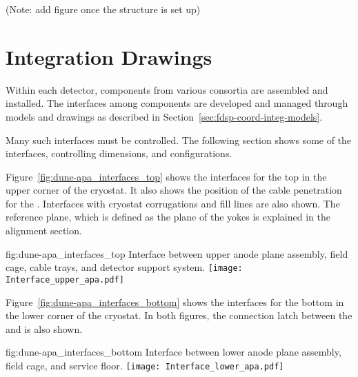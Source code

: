 (Note: add figure once the  structure is set up)






\section{Integration Drawings}
\label{sec:fdsp-coord-integ-drawings}

Within each detector, components from various consortia are assembled
and installed. The interfaces among components are developed and
managed through models and drawings as described in
Section~\ref{sec:fdsp-coord-integ-models}.


Many such interfaces must be controlled. The following
section shows some of the interfaces, controlling dimensions, and
configurations.


Figure~\ref{fig:dune-apa_interfaces_top} shows the interfaces for the
top  in the upper corner of the cryostat. It also shows the position
of the cable penetration for the . Interfaces with cryostat
corrugations and  fill lines are also shown. The reference plane,
which is defined as the plane of the  yokes is explained in the
alignment section.
\begin{dunefigure}{fig:dune-apa_interfaces_top}
  {Interface between upper anode plane assembly, field cage, cable
    trays, and detector support system.}
  \texttt{[image: Interface\_upper\_apa.pdf]}
\end{dunefigure}


Figure~\ref{fig:dune-apa_interfaces_bottom} shows the interfaces for
the bottom  in the lower corner of the cryostat. In both figures,
the connection latch between the  and  is also
shown.
\begin{dunefigure}{fig:dune-apa_interfaces_bottom}
  {Interface between lower anode plane assembly, field cage, and
    service floor.}
  \texttt{[image: Interface\_lower\_apa.pdf]}
\end{dunefigure}


